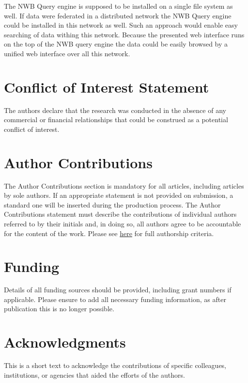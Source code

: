 \documentclass[utf8]{frontiersSCNS} %
\begin{document}
The NWB Query engine is supposed to be installed on a single file system as well. If data were federated in a distributed network the NWB Query engine could be installed in this network as well. Such an approach would enable easy searching of data withing this network. Because the presented web interface runs on the top of the NWB query engine the data could be easily browsed by a unified web interface over all this network.



\section*{Conflict of Interest Statement}

The authors declare that the research was conducted in the absence of any commercial or financial relationships that could be construed as a potential conflict of interest.

\section*{Author Contributions}

The Author Contributions section is mandatory for all articles, including articles by sole authors. If an appropriate statement is not provided on submission, a standard one will be inserted during the production process. The Author Contributions statement must describe the contributions of individual authors referred to by their initials and, in doing so, all authors agree to be accountable for the content of the work. Please see  \href{http://home.frontiersin.org/about/author-guidelines#AuthorandContributors}{here} for full authorship criteria.

\section*{Funding}
Details of all funding sources should be provided, including grant numbers if applicable. Please ensure to add all necessary funding information, as after publication this is no longer possible.

\section*{Acknowledgments}
This is a short text to acknowledge the contributions of specific colleagues, institutions, or agencies that aided the efforts of the authors.
\end{document}
